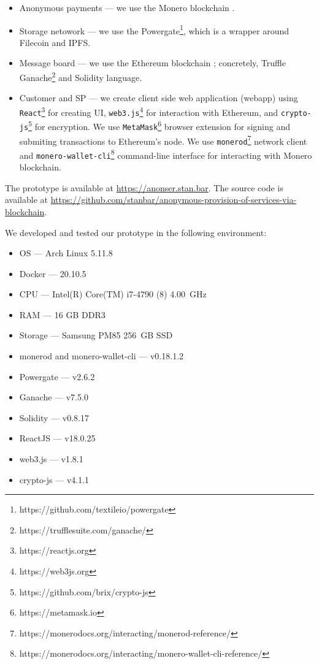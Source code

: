 \documentclass{ieeeaccess}
\begin{document}
\begin{itemize}
  \item{Anonymous payments} — we use the Monero blockchain \cite{noetherRingSignatureConfidential2015}.
  \item{Storage netowork} — we use the Powergate\footnote{https://github.com/textileio/powergate}, which is a wrapper around Filecoin and IPFS.
  \item{Message board} — we use the Ethereum blockchain \cite{woodEthereumSecureDecentralised2014}; concretely, Truffle Ganache\footnote{https://trufflesuite.com/ganache/} and Solidity language.
  \item{Customer and SP} — we create client side web application (webapp) using \texttt{React}\footnote{https://reactjs.org} for creating UI, \texttt{web3.js}\footnote{https://web3js.org} for interaction with Ethereum, and \texttt{crypto-js}\footnote{https://github.com/brix/crypto-js} for encryption. We use \texttt{MetaMask}\footnote{https://metamask.io} browser extension for signing and submiting transactions to Ethereum's node. We use \texttt{monerod}\footnote{https://monerodocs.org/interacting/monerod-reference/} network client and \texttt{monero-wallet-cli}\footnote{https://monerodocs.org/interacting/monero-wallet-cli-reference/} command-line interface for interacting with Monero blockchain.
\end{itemize}

The prototype is available at \url{https://anonser.stan.bar}. The source code is available at \url{https://github.com/stanbar/anonymous-provision-of-services-via-blockchain}.

We developed and tested our prototype in the following environment:

\begin{itemize}
  \item{OS} — Arch Linux 5.11.8
  \item{Docker} — 20.10.5
  \item{CPU} — Intel(R) Core(TM) i7-4790 (8) 4.00~GHz
  \item{RAM} — 16 GB DDR3
  \item{Storage} — Samsung PM85 256~GB SSD

  \item{monerod and monero-wallet-cli} — v0.18.1.2
  \item{Powergate} — v2.6.2
  \item{Ganache} — v7.5.0
  \item{Solidity} — v0.8.17
  \item{ReactJS} — v18.0.25
  \item{web3.js} — v1.8.1
  \item{crypto-js} — v4.1.1
\end{itemize}
\end{document}

